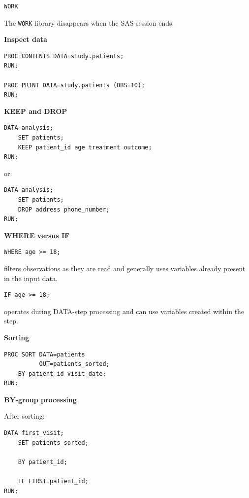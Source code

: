 \documentclass[11pt,letterpaper]{article}
\begin{document}
\begin{lstlisting}
WORK
\end{lstlisting}

The \texttt{WORK} library disappears when the SAS session ends.

\textbf{Inspect data}

\begin{lstlisting}
PROC CONTENTS DATA=study.patients;
RUN;

PROC PRINT DATA=study.patients (OBS=10);
RUN;
\end{lstlisting}

\textbf{KEEP and DROP}

\begin{lstlisting}
DATA analysis;
    SET patients;
    KEEP patient_id age treatment outcome;
RUN;
\end{lstlisting}

or:

\begin{lstlisting}
DATA analysis;
    SET patients;
    DROP address phone_number;
RUN;
\end{lstlisting}

\textbf{WHERE versus IF}

\begin{lstlisting}
WHERE age >= 18;
\end{lstlisting}

filters observations as they are read and generally uses variables already
present in the input data.

\begin{lstlisting}
IF age >= 18;
\end{lstlisting}

operates during DATA-step processing and can use variables created within the
step.

\textbf{Sorting}

\begin{lstlisting}
PROC SORT DATA=patients
          OUT=patients_sorted;
    BY patient_id visit_date;
RUN;
\end{lstlisting}

\textbf{BY-group processing}

After sorting:

\begin{lstlisting}
DATA first_visit;
    SET patients_sorted;

    BY patient_id;

    IF FIRST.patient_id;
RUN;
\end{lstlisting}
\end{document}
